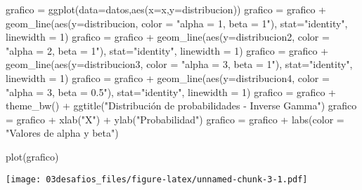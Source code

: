 \documentclass[
]{article}
\newenvironment{Shaded}{\begin{snugshade}}{\end{snugshade}}
\newcommand{\AttributeTok}[1]{\textcolor[rgb]{0.77,0.63,0.00}{#1}}
\newcommand{\DecValTok}[1]{\textcolor[rgb]{0.00,0.00,0.81}{#1}}
\newcommand{\FunctionTok}[1]{\textcolor[rgb]{0.00,0.00,0.00}{#1}}
\newcommand{\NormalTok}[1]{#1}
\newcommand{\OtherTok}[1]{\textcolor[rgb]{0.56,0.35,0.01}{#1}}
\newcommand{\SpecialCharTok}[1]{\textcolor[rgb]{0.00,0.00,0.00}{#1}}
\newcommand{\StringTok}[1]{\textcolor[rgb]{0.31,0.60,0.02}{#1}}
\begin{document}
\begin{Shaded}
\begin{Highlighting}[]
\NormalTok{grafico }\OtherTok{=} \FunctionTok{ggplot}\NormalTok{(}\AttributeTok{data=}\NormalTok{datos,}\FunctionTok{aes}\NormalTok{(}\AttributeTok{x=}\NormalTok{x,}\AttributeTok{y=}\NormalTok{distribucion))}
\NormalTok{grafico }\OtherTok{=}\NormalTok{ grafico }\SpecialCharTok{+} \FunctionTok{geom\_line}\NormalTok{(}\FunctionTok{aes}\NormalTok{(}\AttributeTok{y=}\NormalTok{distribucion, }\AttributeTok{color =} \StringTok{"alpha = 1, beta = 1"}\NormalTok{), }\AttributeTok{stat=}\StringTok{"identity"}\NormalTok{, }\AttributeTok{linewidth =} \DecValTok{1}\NormalTok{)}
\NormalTok{grafico }\OtherTok{=}\NormalTok{ grafico }\SpecialCharTok{+} \FunctionTok{geom\_line}\NormalTok{(}\FunctionTok{aes}\NormalTok{(}\AttributeTok{y=}\NormalTok{distribucion2, }\AttributeTok{color =} \StringTok{"alpha = 2, beta = 1"}\NormalTok{), }\AttributeTok{stat=}\StringTok{"identity"}\NormalTok{, }\AttributeTok{linewidth =} \DecValTok{1}\NormalTok{)}
\NormalTok{grafico }\OtherTok{=}\NormalTok{ grafico }\SpecialCharTok{+} \FunctionTok{geom\_line}\NormalTok{(}\FunctionTok{aes}\NormalTok{(}\AttributeTok{y=}\NormalTok{distribucion3, }\AttributeTok{color =} \StringTok{"alpha = 3, beta = 1"}\NormalTok{), }\AttributeTok{stat=}\StringTok{"identity"}\NormalTok{, }\AttributeTok{linewidth =} \DecValTok{1}\NormalTok{)}
\NormalTok{grafico }\OtherTok{=}\NormalTok{ grafico }\SpecialCharTok{+} \FunctionTok{geom\_line}\NormalTok{(}\FunctionTok{aes}\NormalTok{(}\AttributeTok{y=}\NormalTok{distribucion4, }\AttributeTok{color =} \StringTok{"alpha = 3, beta = 0.5"}\NormalTok{), }\AttributeTok{stat=}\StringTok{"identity"}\NormalTok{, }\AttributeTok{linewidth =} \DecValTok{1}\NormalTok{)}
\NormalTok{grafico }\OtherTok{=}\NormalTok{ grafico }\SpecialCharTok{+} \FunctionTok{theme\_bw}\NormalTok{() }\SpecialCharTok{+} \FunctionTok{ggtitle}\NormalTok{(}\StringTok{"Distribución de probabilidades {-} Inverse Gamma"}\NormalTok{)}
\NormalTok{grafico }\OtherTok{=}\NormalTok{ grafico }\SpecialCharTok{+} \FunctionTok{xlab}\NormalTok{(}\StringTok{"X"}\NormalTok{) }\SpecialCharTok{+} \FunctionTok{ylab}\NormalTok{(}\StringTok{"Probabilidad"}\NormalTok{)}
\NormalTok{grafico }\OtherTok{=}\NormalTok{ grafico }\SpecialCharTok{+} \FunctionTok{labs}\NormalTok{(}\AttributeTok{color =} \StringTok{"Valores de alpha y beta"}\NormalTok{)}

\FunctionTok{plot}\NormalTok{(grafico)}
\end{Highlighting}
\end{Shaded}

\texttt{[image: 03desafios\_files/figure-latex/unnamed-chunk-3-1.pdf]}
\end{document}
